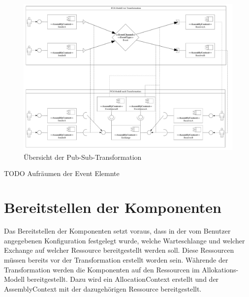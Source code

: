 \begin{figure}
\center
  \includegraphics[width=1\textwidth]{images/transformation/transformationSystemPubSub.pdf}
  \caption{Übersicht der Pub-Sub-Transformation}
  \label{img:transformationPubSub}
\end{figure}

TODO Aufräumen der Event Elemnte

\section{Bereitstellen der Komponenten}
Das Bereitstellen der Komponenten setzt voraus, dass in der vom Benutzer angegebenen Konfiguration festgelegt wurde, welche Warteschlange und welcher Exchange auf welcher Ressource bereitgestellt werden soll. Diese Ressourcen müssen bereits vor der Transformation erstellt worden sein. Währende der Transformation werden die Komponenten auf den Ressourcen im Allokations-Modell bereitgestellt. Dazu wird ein AllocationContext erstellt und der AssemblyContext mit der dazugehörigen Ressource bereitgestellt.

